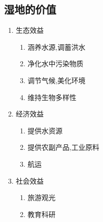 \documentclass[a4paper]{article}
\begin{document}
    \subsection{湿地的价值}
    \begin{enumerate}
        \item 生态效益
        \begin{enumerate}
            \item 涵养水源,调蓄洪水
            \item 净化水中污染物质
            \item 调节气候,美化环境
            \item 维持生物多样性
        \end{enumerate}
        \item 经济效益
        \begin{enumerate}
            \item 提供水资源
            \item 提供农副产品,工业原料
            \item 航运
        \end{enumerate}
        \item 社会效益
        \begin{enumerate}
            \item 旅游观光
            \item 教育科研
        \end{enumerate}
    \end{enumerate}
\end{document}
